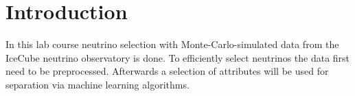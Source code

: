 \section{Introduction}\label{sec:Intro}
In this lab course neutrino selection with Monte-Carlo-simulated data from the IceCube neutrino observatory is done. To efficiently select neutrinos the data first need to be preprocessed. Afterwards a selection of attributes will be used for separation via machine learning algorithms.
